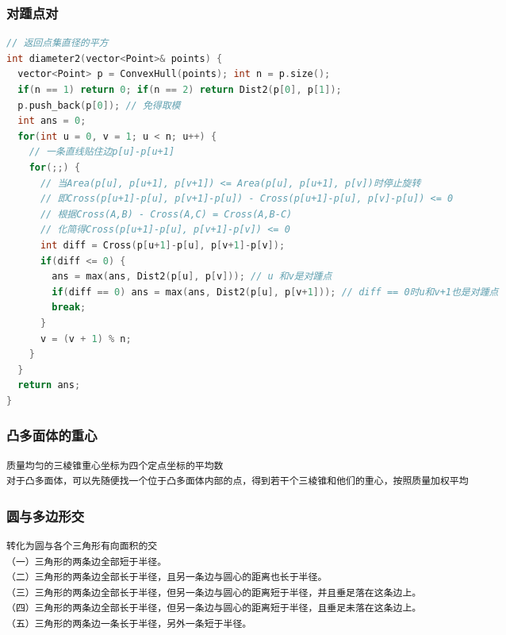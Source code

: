 \documentclass[landscape,a4paper]{article}
\begin{document}
\begin{spacing}{0.3}
\begin{multicols}{2}
\subsubsection{对踵点对}
\begin{lstlisting}[language=C++]
// 返回点集直径的平方
int diameter2(vector<Point>& points) {
  vector<Point> p = ConvexHull(points); int n = p.size();
  if(n == 1) return 0; if(n == 2) return Dist2(p[0], p[1]);
  p.push_back(p[0]); // 免得取模
  int ans = 0;
  for(int u = 0, v = 1; u < n; u++) {
    // 一条直线贴住边p[u]-p[u+1]
    for(;;) {
      // 当Area(p[u], p[u+1], p[v+1]) <= Area(p[u], p[u+1], p[v])时停止旋转
      // 即Cross(p[u+1]-p[u], p[v+1]-p[u]) - Cross(p[u+1]-p[u], p[v]-p[u]) <= 0
      // 根据Cross(A,B) - Cross(A,C) = Cross(A,B-C)
      // 化简得Cross(p[u+1]-p[u], p[v+1]-p[v]) <= 0
      int diff = Cross(p[u+1]-p[u], p[v+1]-p[v]);
      if(diff <= 0) {
        ans = max(ans, Dist2(p[u], p[v])); // u 和v是对踵点
        if(diff == 0) ans = max(ans, Dist2(p[u], p[v+1])); // diff == 0时u和v+1也是对踵点
        break;
      }
      v = (v + 1) % n;
    }
  }
  return ans;
}
\end{lstlisting}
\subsubsection{凸多面体的重心}
\begin{lstlisting}[language=C++]
质量均匀的三棱锥重心坐标为四个定点坐标的平均数
对于凸多面体，可以先随便找一个位于凸多面体内部的点，得到若干个三棱锥和他们的重心，按照质量加权平均
\end{lstlisting}
\subsubsection{圆与多边形交}
\begin{lstlisting}[language=C++]
转化为圆与各个三角形有向面积的交
（一）三角形的两条边全部短于半径。
（二）三角形的两条边全部长于半径，且另一条边与圆心的距离也长于半径。
（三）三角形的两条边全部长于半径，但另一条边与圆心的距离短于半径，并且垂足落在这条边上。
（四）三角形的两条边全部长于半径，但另一条边与圆心的距离短于半径，且垂足未落在这条边上。
（五）三角形的两条边一条长于半径，另外一条短于半径。
\end{lstlisting}

\end{multicols}
\end{spacing}
\end{document}
